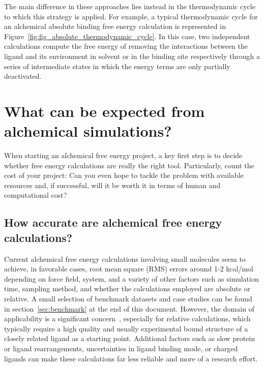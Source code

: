 \documentclass[9pt,bestpractices]{livecoms}
\begin{document}
The main difference in these approaches lies instead in the thermodynamic cycle to which this strategy is applied.
For example, a typical thermodynamic cycle for an alchemical absolute binding free energy calculation is represented in Figure~\ref{fig:fig_absolute_thermodynamic_cycle}.
In this case, two independent calculations compute the free energy of removing the interactions between the ligand and its environment in solvent or in the binding site respectively through a series of intermediate states in which the energy terms are only partially deactivated.




\section{What can be expected from alchemical simulations?}
\label{sec:step0}
When starting an alchemical free energy project, a key first step is to decide whether free energy calculations are really the right tool. Particularly, count the cost of your
project: Can you even hope to tackle the problem with available resources and, if successful, will it
be worth it in terms of human and computational cost?

\subsection{How accurate are alchemical free energy calculations?}
\label{subsec:expectation}
Current alchemical free energy calculations involving small molecules seem to achieve, in favorable cases, root mean square (RMS) errors around 1-2 kcal/mol depending on force field, system, and a variety of other factors such as simulation time, sampling method, and whether the calculations employed are absolute or relative. A small selection of benchmark datasets and case studies can be found in section~\ref{sec:benchmark} at the end of this document.
However, the domain of applicability is a significant concern~\cite{sherborne2016collaborating, cournia2017relative}, especially for relative calculations, which typically require a high quality and usually experimental bound structure of a closely
related ligand as a starting point. Additional factors such as slow protein or ligand rearrangements, uncertainties in ligand binding mode, or charged ligands can make these calculations far less reliable and more of a research effort.
\end{document}
